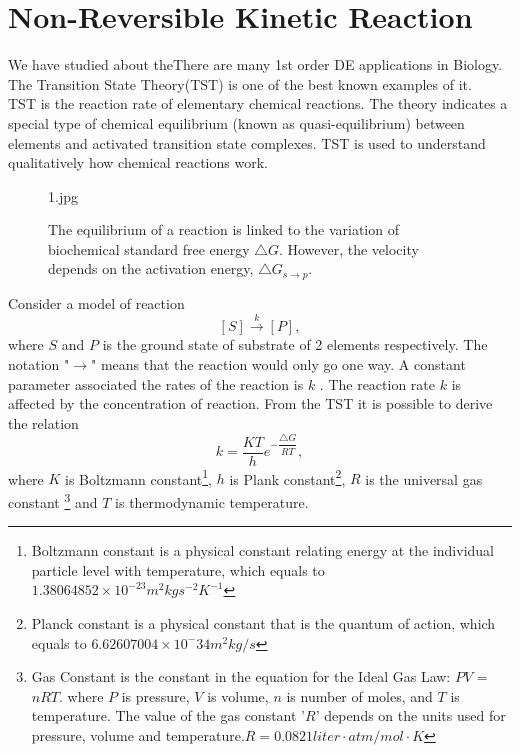\documentclass[a4paper]{report}
\theoremstyle{definition}
\begin{document}
\section{Non-Reversible Kinetic Reaction }
We have studied about theThere are many 1st order DE applications in Biology. The Transition State Theory(TST) is one of the best known examples of it.  
\medskip
\\TST is the reaction rate of elementary chemical reactions. The theory indicates a special type of chemical equilibrium (known as quasi-equilibrium) between elements and activated transition state complexes. TST is used to understand qualitatively how chemical reactions work.
\begin{figure}[H]
\centering
\begin{includegraphics}[width=6cm]{1.jpg}\end{includegraphics}
\caption{The equilibrium of a reaction is linked to the variation of biochemical standard free energy $\triangle G$. However, the velocity depends on the activation energy, $\triangle G_{s{\rightarrow}p}$.}
\label{fig:figure2}
\end{figure}
Consider a model of reaction
\begin{equation}
{[S]{\overset{k}{\rightarrow}}[P]},
\end{equation}
where $S$ and $P$ is the ground state of substrate of 2 elements respectively.
The notation "${\rightarrow}$"  means that the reaction would only go one way. A constant parameter associated the rates of the reaction is $k$ . The reaction rate $k$ is affected by the concentration of reaction. From the TST it is possible to derive the relation
\begin{equation}
{k}=\dfrac{KT}{h}{e}^{-\dfrac{\triangle G}{RT}},
\end{equation}
where $K$ is Boltzmann constant\footnote{Boltzmann constant is a physical constant relating energy at the individual particle level with temperature, which equals to $1.38064852 \times 10^{-23}{m^2}{kg}s^{-2}K^{-1}$}, $h$ is Plank constant\footnote{Planck constant is a physical constant that is the quantum of action, which equals to $6.62607004 \times 10^-34m^2kg/s$}, $R$ is the universal gas constant \footnote{Gas Constant is the constant in the equation for the Ideal Gas Law: $PV$ = $nRT$. where $P$ is pressure, $V$ is volume, $n$ is number of moles, and $T$ is temperature. The value of the gas constant '$R$' depends on the units used for pressure, volume and temperature.$ R = 0.0821 liter·atm/mol·K$} and $T$ is thermodynamic temperature.
\end{document}

